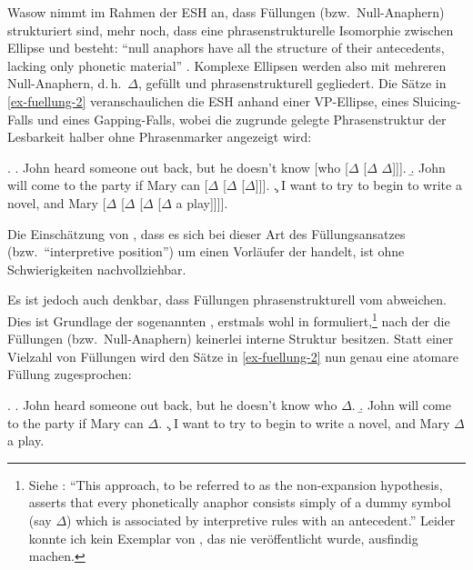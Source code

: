 Wasow nimmt im Rahmen der ESH an, dass Füllungen (bzw.\ Null-Anaphern) strukturiert sind, mehr noch, dass eine phrasenstrukturelle Isomorphie zwischen Ellipse und  besteht: "`null anaphors have all the structure of their antecedents, lacking only phonetic material"' \citep[98]{Wasow:72}. Komplexe Ellipsen werden also mit mehreren Null-Anaphern, d.\,h.\ $\Delta$, gefüllt und phrasenstrukturell gegliedert. Die Sätze in \ref{ex-fuellung-2} veranschaulichen die ESH anhand einer VP-Ellipse, eines Sluicing-Falls und eines Gapping-Falls, wobei die zugrunde gelegte Phrasenstruktur der Lesbarkeit halber ohne Phrasenmarker angezeigt wird:  

\ex. \label{ex-fuellung-2}
\a. John heard someone out back, but he doesn't know [who [$\Delta$ [$\Delta$ $\Delta$]]]. %
\b. John will come to the party if Mary can [$\Delta$ [$\Delta$ [$\Delta$]]].  \hfill \citep[(31)]
{Wasow:72}
\c. I want to try to begin to write a novel, and Mary [$\Delta$ [$\Delta$ [$\Delta$ [$\Delta$  a play]]]].\label{ex-fuellung-2-c}

Die Einschätzung von \citet[6]{Winkler:Schwabe:03}, dass es sich bei dieser Art des Füllungsansatzes (bzw.\ "`interpretive position"') um einen Vorläufer der  handelt, ist ohne Schwierigkeiten nachvollziehbar. 
 
Es ist jedoch auch denkbar, dass Füllungen phrasenstrukturell vom  abweichen. Dies ist Grundlage der sogenannten , erstmals wohl in \cite{Akmajian:68} formuliert,\footnote{Siehe \citet[94]{Wasow:72}: "`This approach, to be referred to as the non-expansion hypothesis, asserts that every phonetically anaphor consists simply of a dummy symbol (say $\Delta$) which is associated by interpretive rules with an antecedent."' Leider konnte ich kein Exemplar von \cite{Akmajian:68}, das nie veröffentlicht wurde, ausfindig machen.} nach der die Füllungen (bzw.\ Null-Anaphern) keinerlei interne Struktur besitzen. Statt einer Vielzahl von Füllungen wird den Sätze in \ref{ex-fuellung-2} nun genau eine atomare Füllung zugesprochen: 

\ex. \label{ex-fuellung-3}
\a. \label{ex-fuellung-3-a}John heard someone out back, but he doesn't know who $\Delta$.
\b. \label{ex-fuellung-3-b}John will come to the party if Mary can $\Delta$.
\c. \label{ex-fuellung-3-c}I want to try to begin to write a novel, and Mary $\Delta$ a play.

